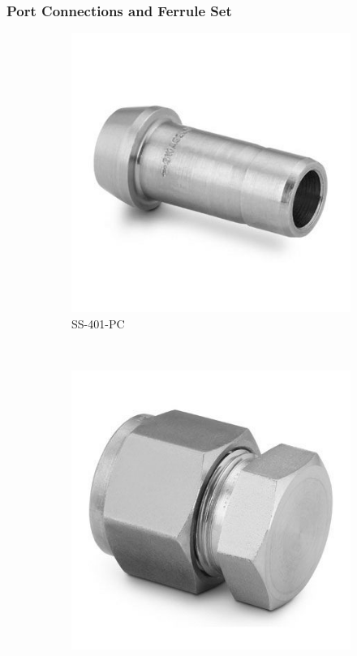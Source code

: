 \documentclass[a4paper,12pt,oneside]{article}
\begin{document}
\begin{appendices}
\subsubsection{Port Connections and Ferrule Set}
\begin{figure}[H]
    \centering
    \begin{subfigure}[b]{0.21\textwidth}
    \centering
    \includegraphics[width=\textwidth]{appendix/img/interfaces/SS-401-PC.jpg}
    \caption{SS-401-PC}
    \end{subfigure}
    ~
    \begin{subfigure}[b]{0.21\textwidth}
    \centering
    \includegraphics[width=\textwidth]{appendix/img/interfaces/SS-400-C.jpg}

\end{subfigure}
\end{figure}
\end{appendices}
\end{document}
